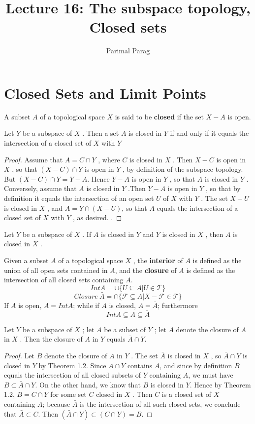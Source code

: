 \documentclass[a4paper,english,12pt]{article}
\title{Lecture 16: The subspace topology, Closed sets}
\author{Parimal Parag}
\begin{document}
\maketitle

\section{Closed Sets and Limit Points}
\begin{defn}
A subset $A$ of a topological space $X$ is said to be \textbf{closed} if the set $X - A$ is open.
\end{defn}
\begin{thm}
Let $Y$ be a subspace of $X$ . Then a set $A$ is closed in $Y$ if and only if
it equals the intersection of a closed set of $X$ with $Y$
\begin{proof}
Assume that $A = C \cap Y$ , where $C$ is closed in $X$ . Then $X-C$ is open in $X$ , so that $(X - C) \cap Y$ is open in $Y$ , by definition of the subspace topology. But $(X - C) \cap Y = Y - A$. Hence $Y - A$ is open in $Y$ , so that $A$ is closed in $Y$ . Conversely, assume that $A$ is closed in $Y$ .Then $Y - A$ is open in $Y$ , so that by definition it equals the intersection of an open set $U$ of $X$ with $Y$ . The set $X - U$ is closed in $X$ , and $A = Y \cap (X - U )$, so that $A$ equals the intersection of a closed set of $X$ with $Y$ , as desired. .
\end{proof}
\end{thm} 
\begin{thm}
Let $Y$ be a subspace of $X$ . If $A$ is closed in $Y$ and $Y$ is closed in $X$ ,
then $A$ is closed in $X$ .
\end{thm}
\begin{defn}
Given a subset $A$ of a topological space $X$ , the \textbf{interior} of $A$ is defined as the union of all open sets contained in $A$, and the \textbf{closure} of $A$ is defined as the intersection of all closed sets containing $A$.
\[ Int A =\cup\{U\subseteq A | U\in \mathcal{T}  \}\]
\[Closure \  \bar{A}= \cap \{\mathcal{F} \subseteq A | X - \mathcal{F} \in \mathcal{T}\}
\]
If $A$ is open, $A = Int A$; while if $A$ is closed, $A = \bar{A}$; furthermore
\[ IntA \subseteq A \subseteq \bar{A}
\]
\end{defn}
\begin{thm}
Let $Y$ be a subspace of $X$ ; let $A$ be a subset of $Y$ ; let $\bar{A}$ denote the
closure of $A$ in $X$ . Then the closure of $A$ in $Y$ equals $\bar{A} \cap Y$.
\begin{proof}
Let $B$ denote the closure of $A$ in $Y$ . The set $\bar{A}$ is closed in $X$ , so $\bar{A} \cap Y$ is closed in $Y$ by Theorem 1.2. Since $A \cap Y$ contains $A$, and since by definition $B$ equals the intersection of all closed subsets of $Y$ containing $A$, we must have $B \subset \bar{A} \cap Y$. On the other hand, we know that $B$ is closed in $Y$. Hence by Theorem 1.2, $B = C \cap Y$ for some set $C$ closed in $X$ . Then $C$ is a closed set of $X$ containing $A$; because $\bar{A}$ is the intersection of all such closed sets, we conclude that $\bar{A} \subset C$. Then $(\bar{A} \cap Y ) \subset (C \cap Y ) = B$.
\end{proof}
\end{thm}
\end{document}

